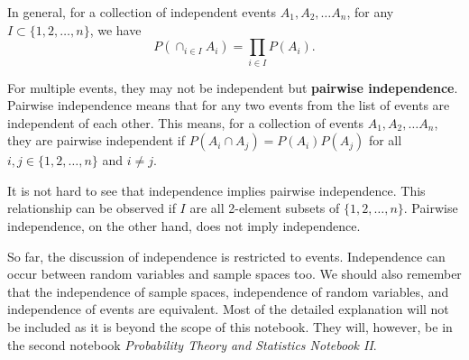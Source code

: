 \documentclass[11pt, a4paper, oneside]{book}
\theoremstyle{definition}
\begin{document}
\noindent In general, for a collection of independent events $A_1, A_2, \dots A_n$, for any $I \subset \{1, 2, \dots, n\}$, we have \[
P(\cap_{i \in I}A_i) = \prod_{i \in I}P(A_i).
\]

\noindent For multiple events, they may not be independent but \textbf{pairwise independence}. Pairwise independence means that for any two events from the list of events are independent of each other. This means, for a collection of events $A_1, A_2, \dots A_n$, they are pairwise independent if $P(A_i \cap A_j) = P(A_i)P(A_j)$ for all $i, j \in \{ 1, 2, \dots, n\}$ and $i \neq j$.  

\noindent It is not hard to see that independence implies pairwise independence. This relationship can be observed if $I$ are all 2-element subsets of $\{1, 2, \dots, n\}$. Pairwise independence, on the other hand, does not imply independence. 

\noindent So far, the discussion of independence is restricted to events. Independence can occur between random variables and sample spaces too. We should also remember that the independence of sample spaces, independence of random variables, and independence of events are equivalent. Most of the detailed explanation will not be included as it is beyond the scope of this notebook. They will, however, be in the second notebook \emph{Probability Theory and Statistics Notebook II}.

\backmatter
\end{document}
